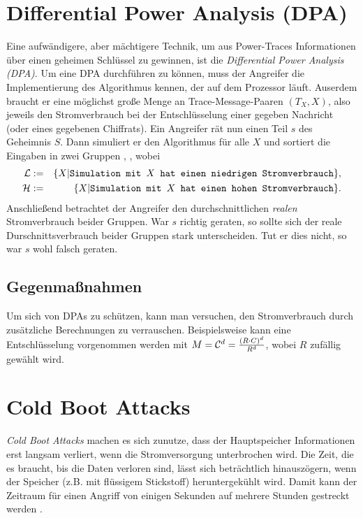 \section{Differential Power Analysis (DPA)}
Eine aufwändigere, aber mächtigere Technik, um aus Power-Traces
Informationen über einen geheimen Schlüssel zu gewinnen, ist die
\emph{Differential Power Analysis (DPA)}. Um eine DPA durchführen zu
können, muss der Angreifer die Implementierung des Algorithmus kennen,
der auf dem Prozessor läuft. Auserdem braucht er eine möglichst große
Menge an Trace-Message-Paaren $(T_X, X)$, also jeweils den Stromverbrauch bei der
Entschlüsselung einer gegeben Nachricht (oder eines gegebenen
Chiffrats).
Ein Angreifer rät nun einen Teil $s$ des Geheimnis $S$. Dann simuliert
er den Algorithmus für alle $X$ und sortiert die Eingaben in zwei
Gruppen \calL, \calH, wobei
\begin{eqnarray*}
\mathcal{L} & := &\{X| \texttt{Simulation mit $X$ hat einen niedrigen
  Stromverbrauch}\},\\
\mathcal{H} & := &\{X| \texttt{Simulation mit $X$ hat einen hohen
  Stromverbrauch}\}.
\end{eqnarray*}
Anschließend betrachtet der Angreifer den durchschnittlichen
\textit{realen} Stromverbrauch beider Gruppen. War $s$ richtig geraten,
so sollte sich der reale Durschnittsverbrauch beider Gruppen stark
unterscheiden. Tut er dies nicht, so war $s$ wohl falsch geraten.

\subsection{Gegenmaßnahmen}
Um sich von DPAs zu schützen, kann man versuchen, den Stromverbrauch
durch zusätzliche Berechnungen zu verrauschen. Beispielsweise kann eine
Entschlüsselung vorgenommen werden mit $M = \mathcal{C}^d = \frac{(R\cdot
  C)^d}{R^d}$, wobei $R$ zufällig gewählt wird.

\section{Cold Boot Attacks}
\emph{Cold Boot Attacks} machen es sich zunutze, dass der Hauptspeicher
Informationen erst langsam verliert, wenn die Stromversorgung
unterbrochen wird. Die Zeit, die es braucht, bis die Daten verloren
sind, lässt sich beträchtlich hinauszögern, wenn der Speicher (z.B. mit
flüssigem Stickstoff) heruntergekühlt wird. Damit kann der Zeitraum für
einen Angriff von einigen Sekunden auf mehrere Stunden gestreckt werden
\cite{Halderman08leastwe}.

